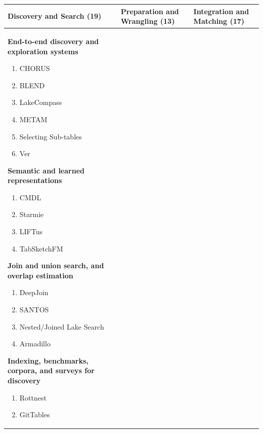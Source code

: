 \documentclass[sigconf]{acmart}
\begin{document}
\begin{table}[t]
\centering
\scriptsize
\setlength{\tabcolsep}{4pt}
\renewcommand{\arraystretch}{1.10}
\begin{tabularx}{\textwidth}{@{}>{\raggedright\arraybackslash}X>{\raggedright\arraybackslash}X>{\raggedright\arraybackslash}X@{}}
\toprule
\textbf{Discovery and Search (19)} & \textbf{Preparation and Wrangling (13)} & \textbf{Integration and Matching (17)} \\
\midrule
\begin{minipage}[t]{\linewidth}\vspace{0pt}
\textbf{End-to-end discovery and exploration systems}
\begin{enumerate}[leftmargin=*,itemsep=1pt,topsep=1pt]
\item CHORUS~\cite{10.14778/3659437.3659461}
\item BLEND~\cite{11112882}
\item LakeCompass~\cite{10.14778/3685800.3685880}
\item METAM~\cite{10184845}
\item Selecting Sub-tables~\cite{10184535}
\item Ver~\cite{10184768}
\end{enumerate}
\textbf{Semantic and learned representations}
\begin{enumerate}[leftmargin=*,itemsep=1pt,topsep=1pt]
\item CMDL~\cite{10.14778/3611479.3611533}
\item Starmie~\cite{10.14778/3587136.3587146}
\item LIFTus~\cite{11113165}
\item TabSketchFM~\cite{11113110}
\end{enumerate}
\textbf{Join and union search, and overlap estimation}
\begin{enumerate}[leftmargin=*,itemsep=1pt,topsep=1pt]
\item DeepJoin~\cite{10.14778/3603581.3603587}
\item SANTOS~\cite{10.1145/3588689}
\item Nested/Joined Lake Search~\cite{10.14778/3681954.3682005}
\item Armadillo~\cite{10.1145/3725365}
\end{enumerate}
\textbf{Indexing, benchmarks, corpora, and surveys for discovery}
\begin{enumerate}[leftmargin=*,itemsep=1pt,topsep=1pt]
\item Rottnest~\cite{11113229}
\item GitTables~\cite{10.1145/3588710}

\end{enumerate}
\end{minipage}
\end{tabularx}
\end{table}
\end{document}
